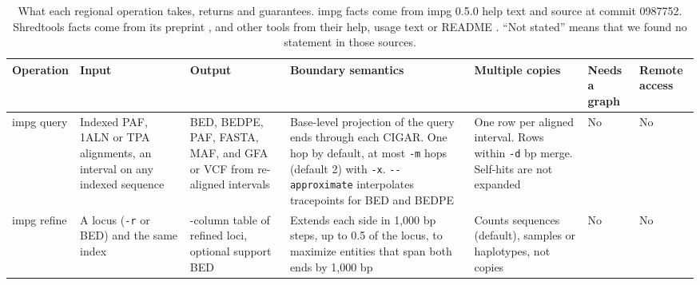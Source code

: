 \begin{table}[!t]
\caption{\label{tab:semantics}What each regional operation takes, returns and guarantees.
impg facts come from impg 0.5.0 help text and source at commit 0987752.
Shredtools facts come from its preprint \citep{Shivakumar2026shredtools}, and other tools from their help, usage text or README \citep{Guarracino2022odgi,Garrison2018vg,Kent2003chain,Kuhn2013ucsc,Hickey2013hal,Chin2023pgrtk}.
``Not stated'' means that we found no statement in those sources.}
\centering
\scriptsize
\setlength{\tabcolsep}{3pt}
\begin{tabular}{@{}>{\raggedright\arraybackslash}p{1.5cm}>{\raggedright\arraybackslash}p{2.5cm}>{\raggedright\arraybackslash}p{2.3cm}>{\raggedright\arraybackslash}p{3.5cm}>{\raggedright\arraybackslash}p{3.1cm}>{\raggedright\arraybackslash}p{1.3cm}>{\raggedright\arraybackslash}p{1.6cm}@{}}
\toprule
Operation & Input & Output & Boundary semantics & Multiple copies & Needs a graph & Remote access \\
\midrule
impg query & Indexed PAF, 1ALN or TPA alignments, an interval on any indexed sequence & BED, BEDPE, PAF, FASTA, MAF, and GFA or VCF from re-aligned intervals & Base-level projection of the query ends through each CIGAR. One hop by default, at most \texttt{-m} hops (default 2) with \texttt{-x}. \texttt{-{}-approximate} interpolates tracepoints for BED and BEDPE & One row per aligned interval. Rows within \texttt{-d} bp merge. Self-hits are not expanded & No & No \\
impg refine & A locus (\texttt{-r} or BED) and the same index & 8-column table of refined loci, optional support BED & Extends each side in 1,000 bp steps, up to 0.5 of the locus, to maximize entities that span both ends by 1,000 bp & Counts sequences (default), samples or haplotypes, not copies & No & No \\

\end{tabular}
\end{table}
